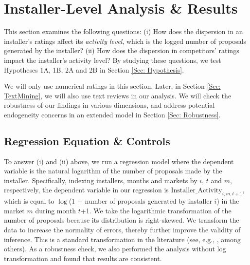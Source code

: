 \documentclass[msom,blindrev]{informs3}
\begin{document}
	
	
	
	
	
	\section{Installer-Level Analysis \& Results} \label{Sec: Installer-level}
	
	This section examines the following questions: (i) How does the dispersion in an installer's ratings affect its \emph{activity level}, which is the logged  number of proposals generated by the installer? (ii) How does the dispersion in competitors' ratings impact the installer's activity level? By studying these questions, we test Hypotheses 1A, 1B, 2A and 2B in Section \ref{Sec: Hypothesis}.
	
	
	We will only use numerical ratings in this section. Later, in Section \ref{Sec: TextMining}, we will also use text reviews in our analysis. We will check the robustness of our findings in various dimensions, and address potential endogeneity concerns in an extended model in Section \ref{Sec: Robustness}.
	
	\subsection{Regression Equation \& Controls}
	
	To answer (i) and (ii) above, we run a regression model where the dependent variable is the natural logarithm of the number of proposals made by the installer. Specifically, indexing installers, months and markets by $i$, $t$ and $m$, respectively, the dependent variable in our regression is  $\text{Installer\_Activity}_{i,m,t+1}$, which is equal to $\log$(1 $+$ number of proposals generated by installer $i$) in the market $m$ during month $t$+1. We take the logarithmic transformation of the number of proposals because its distribution is right-skewed.  We transform the data to increase the normality of errors, thereby further improve the validity of inference. This is a standard transformation in the literature (see, e.g., \citet{song2017closing,tan2014does}, among others). As a robustness check, we also performed the analysis without log transformation and found that results are consistent.
	
\end{document}
